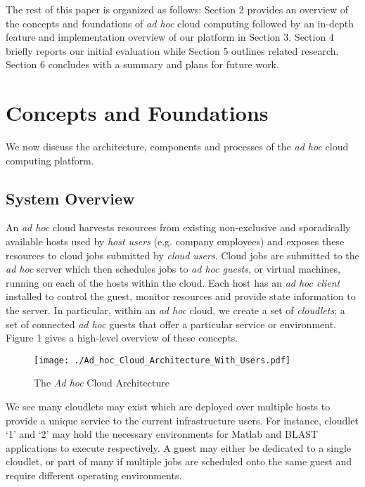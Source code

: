\documentclass[10pt, conference, compsocconf]{IEEEtran}
\begin{document}
The rest of this paper is organized as follows: Section 2 provides an overview of the concepts and foundations of \textit{ad hoc} cloud computing followed by an in-depth feature and implementation overview of our platform in Section 3. Section 4 briefly reports our initial evaluation while Section 5 outlines related research. Section 6 concludes with a summary and plans for future work.

\section{Concepts and Foundations} 
We now discuss the architecture, components and processes of the \textit{ad hoc} cloud computing platform. 

\subsection{System Overview}
An \textit{ad hoc} cloud harvests resources from existing non-exclusive and sporadically available hosts used by \textit{host users} (e.g. company employees) and exposes these resources to cloud jobs submitted by \textit{cloud users}. Cloud jobs are submitted to the \textit{ad hoc} server which then schedules jobs to \textit{ad hoc guests}, or virtual machines, running on each of the hosts within the cloud. Each host has an \textit{ad hoc client} installed to control the guest, monitor resources and provide state information to the server. In particular, within an \textit{ad hoc} cloud, we create a set of \textit{cloudlets}; a set of connected \textit{ad hoc} guests that offer a particular service or environment. Figure 1 gives a high-level overview of these concepts.

\begin{figure}[h!]
 \begin{center}
\texttt{[image: ./Ad\_hoc\_Cloud\_Architecture\_With\_Users.pdf]}
 \end{center}
 \caption{The \textit{Ad hoc} Cloud Architecture}
\end{figure}

\noindent We see many cloudlets may exist which are deployed over multiple hosts to provide a unique service to the current infrastructure users. For instance, cloudlet `1'  and `2' may hold the necessary environments for Matlab and BLAST applications to execute respectively. A guest may either be dedicated to a single cloudlet, or part of many if multiple jobs are scheduled onto the same guest and require different operating environments. 
\end{document}
